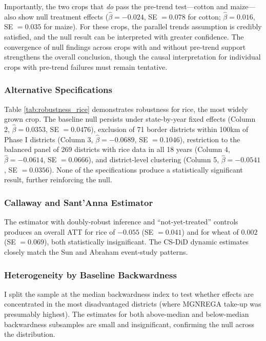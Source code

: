 \documentclass[12pt]{article}
\begin{document}
Importantly, the two crops that \textit{do} pass the pre-trend test---cotton and maize---also show null treatment effects ($\hat\beta = -0.024$, SE $= 0.078$ for cotton; $\hat\beta = 0.016$, SE $= 0.035$ for maize). For these crops, the parallel trends assumption is credibly satisfied, and the null result can be interpreted with greater confidence. The convergence of null findings across crops with and without pre-trend support strengthens the overall conclusion, though the causal interpretation for individual crops with pre-trend failures must remain tentative.

\subsubsection{Alternative Specifications}



Table \ref{tab:robustness_rice} demonstrates robustness for rice, the most widely grown crop. The baseline null persists under state-by-year fixed effects (Column 2, $\hat\beta = 0.0353$, SE $= 0.0476$), exclusion of 71 border districts within 100km of Phase I districts (Column 3, $\hat\beta = -0.0689$, SE $= 0.1046$), restriction to the balanced panel of 269 districts with rice data in all 18 years (Column 4, $\hat\beta = -0.0614$, SE $= 0.0666$), and district-level clustering (Column 5, $\hat\beta = -0.0541$, SE $= 0.0356$). None of the specifications produce a statistically significant result, further reinforcing the null.

\subsubsection{Callaway and Sant'Anna Estimator}

The \citet{callaway2021difference} estimator with doubly-robust inference and ``not-yet-treated'' controls produces an overall ATT for rice of $-0.055$ (SE $= 0.041$) and for wheat of $0.002$ (SE $= 0.069$), both statistically insignificant. The CS-DiD dynamic estimates closely match the Sun and Abraham event-study patterns.

\subsubsection{Heterogeneity by Baseline Backwardness}

I split the sample at the median backwardness index to test whether effects are concentrated in the most disadvantaged districts (where MGNREGA take-up was presumably highest). The estimates for both above-median and below-median backwardness subsamples are small and insignificant, confirming the null across the distribution.
\end{document}
